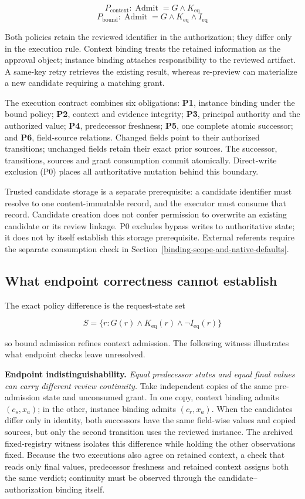 \[
P_{\mathrm{context}}: \operatorname{Admit} = G \land  K_{\mathrm{eq}}
\] \[
P_{\mathrm{bound}}:   \operatorname{Admit} = G \land  K_{\mathrm{eq}} \land  I_{\mathrm{eq}}
\]

Both policies retain the reviewed identifier in the authorization; they differ only in the execution rule. Context binding treats the retained information as the approval object; instance binding attaches responsibility to the reviewed artifact. A same-key retry retrieves the existing result, whereas re-preview can materialize a new candidate requiring a matching grant.

The execution contract combines six obligations: \textbf{P1}, instance binding under the bound policy; \textbf{P2}, context and evidence integrity; \textbf{P3}, principal authority and the authorized value; \textbf{P4}, predecessor freshness; \textbf{P5}, one complete atomic successor; and \textbf{P6}, field-source relations. Changed fields point to their authorized transitions; unchanged fields retain their exact prior sources. The successor, transitions, sources and grant consumption commit atomically. Direct-write exclusion (P0) places all authoritative mutation behind this boundary.

Trusted candidate storage is a separate prerequisite: a candidate identifier must resolve to one content-immutable record, and the executor must consume that record. Candidate creation does not confer permission to overwrite an existing candidate or its review linkage. P0 excludes bypass writes to authoritative state; it does not by itself establish this storage prerequisite. External referents require the separate consumption check in Section~\ref{binding-scope-and-native-defaults}.

\subsection{What endpoint correctness cannot establish}\label{what-endpoint-correctness-cannot-establish}

The exact policy difference is the request-state set

\[
S = \{r : G(r) \land  K_{\mathrm{eq}}(r) \land  \neg I_{\mathrm{eq}}(r)\}
\]

so bound admission refines context admission. The following witness illustrates what endpoint checks leave unresolved.

\textbf{Endpoint indistinguishability.} \emph{Equal predecessor states and equal final values can carry different review continuity.} Take independent copies of the same pre-admission state and unconsumed grant. In one copy, context binding admits \((c_s,x_a)\); in the other, instance binding admits \((c_r,x_a)\). When the candidates differ only in identity, both successors have the same field-wise values and copied sources, but only the second transition uses the reviewed instance. The archived fixed-registry witness isolates this difference while holding the other observations fixed. Because the two executions also agree on retained context, a check that reads only final values, predecessor freshness and retained context assigns both the same verdict; continuity must be observed through the candidate--authorization binding itself.

